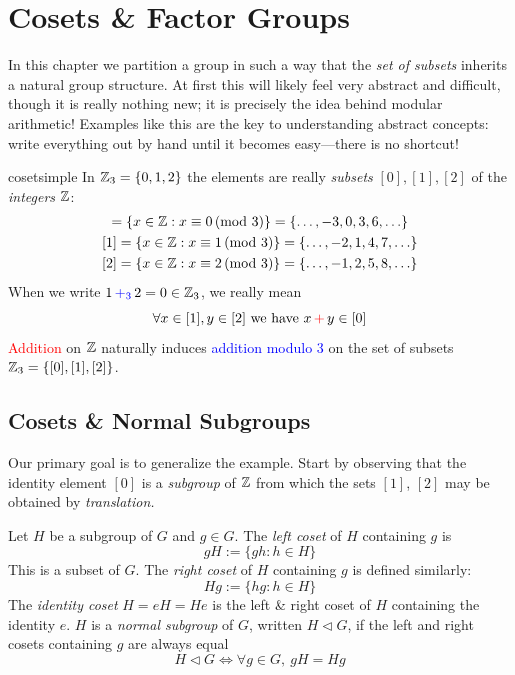 \graphicspath{{6coset/asy/}}

\section{Cosets \& Factor Groups}\label{chap:coset}

In this chapter we partition a group in such a way that the \emph{set of subsets} inherits a natural group structure. At first this will likely feel very abstract and difficult, though it is really nothing new; it is precisely the idea behind modular arithmetic! Examples like this are the key to understanding abstract concepts: write everything out by hand until it becomes easy---there is no shortcut!

\begin{example}{}{cosetsimple}
	In $\mathbb{Z}_3=\{0,1,2\}$ the elements are really \emph{subsets} $[0],[1],[2]$ of the \emph{integers} $\mathbb{Z}$:
	\begin{gather*}
		[0]=\{x\in\Z:x \equiv 0\negthickspace\pmod 3\} =\{\ldots,-3,0,3,6,\ldots\}\\
		[1]=\{x\in\Z:x \equiv 1\negthickspace\pmod 3\} =\{\ldots,-2,1,4,7,\ldots\}\\
		[2]=\{x\in\Z:x \equiv 2\negthickspace\pmod 3\} =\{\ldots,-1,2,5,8,\ldots\}
	\end{gather*}
	When we write $1\operatorname{\textcolor{blue}{+_3}}2=0\in\mathbb{Z}_3$, we really mean
	\[
		\forall x\in[1], y\in[2]
		\text{ we have }
		x\operatorname{\textcolor{red}{+}}y\in [0]
	\]
	\textcolor{red}{Addition} on $\mathbb{Z}$ naturally induces \textcolor{blue}{addition modulo 3} on the set of subsets $\mathbb{Z}_3=\{[0],[1],[2]\}$.
\end{example}


\subsection{Cosets \& Normal Subgroups}\label{sec:cosetnormal}

Our primary goal is to generalize the example. Start by observing that the identity element $[0]$ is a \emph{subgroup} of $\mathbb{Z}$ from which the sets $[1]$, $[2]$ may be obtained by \emph{translation.}



\begin{defn}{}{}
	Let $H$ be a subgroup of $G$ and $g\in G$. The \emph{left coset} of $H$ containing $g$ is 
	\[
		gH:=\{gh:h\in H\}\tag{$x\in gH\iff \exists h\in H$ such that $x=gh$}
	\]
	This is a subset of $G$. The \emph{right coset} of $H$ containing $g$ is defined similarly:
	\[
		Hg:=\{hg:h\in H\}
	\]
	The \emph{identity coset} $H=eH=He$ is the left \& right coset of $H$ containing the identity $e$.\smallbreak
	$H$ is a \emph{normal subgroup} of $G$, written $H\triangleleft G$, if the left and right cosets containing $g$ are always equal
	\[
		H\triangleleft G
		\iff
		\forall g\in G,\ gH=Hg
	\]
\end{defn}

